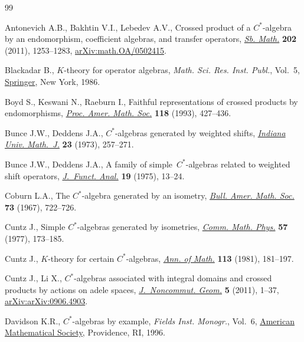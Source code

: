 \begin{thebibliography}{99}
\footnotesize\itemsep=0pt

Antonevich A.B., Bakhtin V.I., Lebedev A.V., Crossed product of a
 {$C^*$}-algebra by an endomorphism, coefficient algebras, and transfer
 operators, \href{https://doi.org/10.1070/SM2011v202n09ABEH004186}{\textit{Sb.
 Math.}} \textbf{202} (2011), 1253--1283,
 \href{http://arxiv.org/abs/math.OA/0502415}{arXiv:math.OA/0502415}.

Blackadar B., {$K$}-theory for operator algebras, \textit{Math. Sci. Res. Inst.
 Publ.}, Vol.~5, \href{https://doi.org/10.1007/978-1-4613-9572-0}{Springer},
 New York, 1986.

Boyd S., Keswani N., Raeburn I., Faithful representations of crossed products
 by endomorphisms, \href{https://doi.org/10.2307/2160319}{\textit{Proc. Amer.
 Math. Soc.}} \textbf{118} (1993), 427--436.

Bunce J.W., Deddens J.A., {$C^{\ast} $}-algebras generated by weighted shifts,
 \href{https://doi.org/10.1512/iumj.1973.23.23022}{\textit{Indiana Univ.
 Math.~J.}} \textbf{23} (1973), 257--271.

Bunce J.W., Deddens J.A., A family of simple~{$C^{\ast} $}-algebras related to
 weighted shift operators,
 \href{https://doi.org/10.1016/0022-1236(75)90003-8}{\textit{J.~Funct. Anal.}}
 \textbf{19} (1975), 13--24.

Coburn L.A., The {$C^{\ast} $}-algebra generated by an isometry,
 \href{https://doi.org/10.1090/S0002-9904-1967-11845-7}{\textit{Bull. Amer.
 Math. Soc.}} \textbf{73} (1967), 722--726.

Cuntz J., Simple {$C^*$}-algebras generated by isometries,
 \href{https://doi.org/10.1007/BF01625776}{\textit{Comm. Math. Phys.}}
 \textbf{57} (1977), 173--185.

Cuntz J., {$K$}-theory for certain {$C^{\ast} $}-algebras,
 \href{https://doi.org/10.2307/1971137}{\textit{Ann. of Math.}} \textbf{113}
 (1981), 181--197.

Cuntz J., Li X., {$C^\ast$}-algebras associated with integral domains and
 crossed products by actions on adele spaces,
 \href{https://doi.org/10.4171/JNCG/68}{\textit{J.~Noncommut. Geom.}}
 \textbf{5} (2011), 1--37,
 \href{http://arxiv.org/abs/arXiv:0906.4903}{arXiv:arXiv:0906.4903}.

Davidson K.R., {$C^*$}-algebras by example, \textit{Fields Inst. Monogr.},
 Vol.~6, \href{https://doi.org/10.1090/fim/006}{American Mathematical Society},
 Providence, RI, 1996.


\end{thebibliography}
